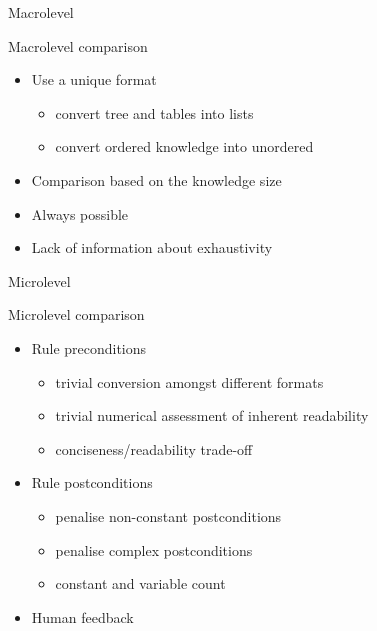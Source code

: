 \documentclass{beamer}
\newcommand{\eg}{\item[e.g.]}
\newcommand{\yes}{\item[\ding{51}]}
\newcommand{\no}{\item[\ding{56}]}
\newcommand{\lookat}{\item[\ding{43}]}
\begin{document}
\begin{frame}[c]{Macrolevel}
	\begin{block}{Macrolevel comparison}
		\medskip
		\begin{itemize}
			\item Use a unique format
			\begin{itemize}
				\item convert tree and tables into lists
				\item convert ordered knowledge into unordered
			\end{itemize}
			\medskip
			\lookat Comparison based on the knowledge size
			\medskip
			\yes Always possible
			\medskip
			\no Lack of information about exhaustivity 
		\end{itemize}
		\medskip
	\end{block}
\end{frame}

\begin{frame}[c]{Microlevel}
	\begin{block}{Microlevel comparison}
		\medskip
		\begin{itemize}
			\item Rule preconditions
			\begin{itemize}
				\no trivial conversion amongst different formats
				\no trivial numerical assessment of inherent readability
				\item conciseness/readability trade-off
			\end{itemize}
			\medskip
			\item Rule postconditions
			\begin{itemize}
				\item penalise non-constant postconditions
				\item penalise complex postconditions
				\eg constant and variable count
			\end{itemize}
			\medskip
			\lookat Human feedback
		\end{itemize}
		\medskip
	\end{block}
\end{frame}
\end{document}
